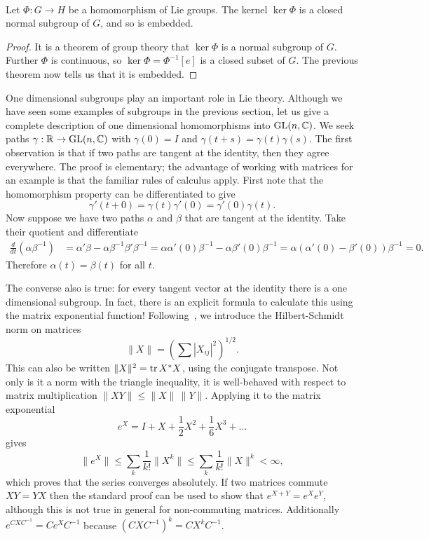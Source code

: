 \begin{corollary}
\label{cor:kernel of hom}
\textup{\cite[Prop~3.31]{Hall2015}} \\
Let $\Phi : G \to H$ be a homomorphism of Lie groups.
The kernel $\ker \Phi$ is a closed normal subgroup of $G$, and so is embedded.
\end{corollary}
\begin{proof}
It is a theorem of group theory that $\ker\Phi$ is a normal subgroup of $G$.
Further $\Phi$ is continuous, so $\ker\Phi = \Phi^{-1}[e]$ is a closed subset of $G$.
The previous theorem now tells us that it is embedded.
\end{proof}

One dimensional subgroups play an important role in Lie theory.
Although we have seen some examples of subgroups in the previous section, let us give a complete description of one dimensional homomorphisms into $\mathrm{GL}(n,\mathbb{C})$.
We seek paths $\gamma : \mathbb{R} \to \mathrm{GL}(n,\mathbb{C})$ with $\gamma(0) = I$ and $\gamma(t+s) = \gamma(t)\gamma(s)$.
The first observation is that if two paths are tangent at the identity, then they agree everywhere.
The proof is elementary; the advantage of working with matrices for an example is that the familiar rules of calculus apply.
First note that the homomorphism property can be differentiated to give
\[
\gamma'(t + 0) = \gamma(t)\gamma'(0) = \gamma'(0)\gamma(t).
\]
Now suppose we have two paths $\alpha$ and $\beta$ that are tangent at the identity.
Take their quotient and differentiate
\begin{align*}
\frac{d}{dt} (\alpha\beta^{-1})
&= \alpha'\beta - \alpha\beta^{-1}\beta'\beta^{-1}
= \alpha\alpha'(0)\beta^{-1} - \alpha\beta'(0)\beta^{-1}
= \alpha(\alpha'(0) - \beta'(0))\beta^{-1}
= 0.
\end{align*}
Therefore $\alpha(t) = \beta(t)$ for all $t$.

The converse also is true: for every tangent vector at the identity there is a one dimensional subgroup.
In fact, there is an explicit formula to calculate this using the matrix exponential function!
Following~\cite[Section~2.1]{Hall2015}, we introduce the Hilbert-Schmidt norm on matrices
\[
\|X\| = \left( \sum |X_{ij}|^2 \right)^{1/2}.
\]
This can also be written $\|X\|^2 = \operatorname{tr} X^\ast X$, using the conjugate transpose.
Not only is it a norm with the triangle inequality, it is well-behaved with respect to matrix multiplication $\|XY\| \leq \|X\|\,\|Y\|$.
Applying it to the matrix exponential
\[
e^X = I + X + \frac{1}{2}X^2 + \frac{1}{6}X^3 + \dots
\]
gives
\[
\|e^X\|
\leq \sum_k \frac{1}{k!} \|X^k \|
\leq \sum_k \frac{1}{k!} \|X\|^k
< \infty,
\]
which proves that the series converges absolutely.
If two matrices commute $XY = YX$ then the standard proof can be used to show that $e^{X+Y} = e^X e^Y$, although this is not true in general for non-commuting matrices.
Additionally $e^{CXC^{-1}} = Ce^X C^{-1}$ because $(CXC^{-1})^k = CX^k C^{-1}$.


